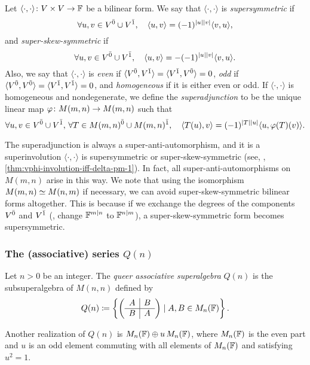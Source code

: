 \begin{defi}
Let $\langle \cdot, \cdot \rangle \colon V\times V \to \mathbb{F}$ be a bilinear form. 
We say that $\langle \cdot, \cdot \rangle$ is  \emph{supersymmetric} if
\[
    \forall u,v \in V^{\bar0} \cup V^{\bar1}, \quad \langle u, v \rangle 
    = (-1)^{|u||v|} \langle v, u \rangle,
\]
and \emph{super-skew-symmetric} if
\[
    \forall u,v \in V^{\bar0} \cup V^{\bar1}, \quad \langle u, v \rangle 
    = -(-1)^{|u||v|} \langle v, u \rangle.
\]
Also, we say that $\langle \cdot, \cdot \rangle$ is \emph{even} if $\langle V^{\bar0}, V^{\bar1} \rangle = \langle V^{\bar1}, V^{\bar0} \rangle = 0$, \emph{odd} if $\langle V^{\bar0}, V^{\bar0} \rangle = \langle V^{\bar1}, V^{\bar1} \rangle = 0$, and \emph{homogeneous} if it is either even or odd. 
If $\langle \cdot, \cdot \rangle$ is homogeneous and nondegenerate, we define the \emph{superadjunction} to be the unique linear map $\varphi\colon M(m,n) \to M(m,n)$ such that 
\[
    \forall u,v \in V^{\bar0} \cup V^{\bar1},\,
    \forall T\in M(m,n)^{\bar0} \cup M(m,n)^{\bar1}, \quad
    \langle T(u), v \rangle = (-1)^{|T||u|} \langle u, \varphi(T)(v) \rangle. 
\]
\end{defi}

The superadjunction is always a super-anti-automorphism, and it is a superinvolution \IFF $\langle \cdot, \cdot \rangle$ is supersymmetric or super-skew-symmetric (see, \eg, \cref{thm:vphi-involution-iff-delta-pm-1}). 
In fact, all super-anti-automorphisms on $M(m,n)$ arise in this way. 
We note that using the isomorphism $M(m,n) \simeq M(n,m)$ if necessary, we can avoid super-skew-symmetric bilinear forms altogether. 
This is because if we exchange the degrees of the components $V^{\bar0}$ and $V^{\bar1}$ (\ie, change $\mathbb{F}^{m|n}$ to $\mathbb{F}^{n|m}$), a super-skew-symmetric form becomes supersymmetric. 

\subsubsection{The (associative) series \texorpdfstring{$Q(n)$}{Q(n)}}

Let $n > 0$ be an integer. 
The \emph{queer associative superalgebra} $Q(n)$ is the subsuperalgebra of $M(n,n)$ defined by
\[
    Q(n) \coloneqq \left\{ \left(\begin{array}{c|c}
        A & B\\
        \hline
        B & A
    \end{array}\right)
    \mid A,B\in M_{n}(\mathbb{F})
    \right\}.
\]

Another realization of $Q(n)$ is $M_n(\mathbb{F}) \oplus u\, M_n(\mathbb{F})$, where $M_n(\mathbb{F})$ is the even part and $u$ is an odd element commuting with all elements of $M_n(\mathbb{F})$ and satisfying $u^2 = 1$. 

